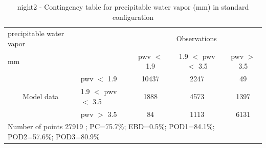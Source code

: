 \begin{table}[p!]
\begin{center}
\begin{tabular}{llccc}
\hline
{precipitable water vapor}                                       &                                                    & \multicolumn{3}{c}{Observations}                 \\
{mm}                                       &                             & pwv $<$ 1.9   & 1.9 $<$ pwv $<$ 3.5 & pwv $>$ 3.5 \\
\hline
\multicolumn{1}{c}{\multirow{3}{*}{Model data}}  & pwv $<$ 1.9             & 10437                & 2247                       & 49              \\
                                                 & 1.9  $<$ pwv $<$ 3.5 & 1888                & 4573                       & 1397              \\
                                                 & pwv $>$ 3.5             & 84                & 1113                       & 6131              \\
\hline
\multicolumn{5}{l}{ Number of points        27919 ; PC=75.7\%; EBD=0.5\%; POD1=84.1\%; POD2=57.6\%; POD3=80.9\%}                 \\
\end{tabular}
\end{center}
\caption{night2 - Contingency table for  precipitable water vapor (mm) in standard configuration  }
\label{tab:contingencypwvBEF:night2}
\end{table}
